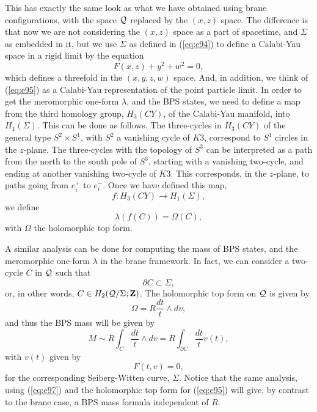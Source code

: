 This has exactly the same look as what we have obtained using
brane configurations, with the space ${\cal Q}$ replaced by the
$(x,z)$ space. The difference is that now we are not considering
the $(x,z)$ space as a part of spacetime, and $\Sigma$ as
embedded in it, but we use $\Sigma$ as defined in (\ref{eq:e94})
to define a Calabi-Yau space in a rigid limit by the equation
\begin{equation}
F(x,z)+y^2+w^2=0,
\label{eq:e95}
\end{equation}
which defines a threefold in the $(x,y,z,w)$ space. And, in
addition, we think of (\ref{eq:e95}) as a Calabi-Yau
representation of the point particle limit. In order to get the
meromorphic one-form $\lambda$, and the BPS states, we need to
define a map from the third homology group, $H_3(CY)$, of the
Calabi-Yau manifold, into $H_1(\Sigma)$. This can be done as
follows. The three-cycles in $H_3(CY)$ of the general type $S^2
\times S^1$, with $S^2$ a vanishing cycle of $K3$, correspond to
$S^1$ circles in the $z$-plane. The three-cycles with the
topology of $S^3$ can be interpreted as a path from the north to
the south pole of $S^3$, starting with a vanishing two-cycle, and
ending at another vanishing two-cycle of $K3$. This corresponds,
in the $z$-plane, to paths going from $e_i^+$ to $e_i^-$. Once we
have defined this map,
\begin{equation}
f: H_3(CY) \longrightarrow H_1(\Sigma),
\label{eq:e96}
\end{equation}
we define 
\begin{equation}
\lambda (f(C)) = \Omega (C),
\label{eq:e97}
\end{equation}
with $\Omega$ the holomorphic top form. 
  
A similar analysis can be done for computing the mass of BPS
states, and the meromorphic one-form $\lambda$ in the brane
framework. In fact, we can consider a two-cycle $C$ in ${\cal Q}$
such that
\begin{equation}
\partial C \subset \Sigma,
\label{eq:e98}
\end{equation}
or, in other words, $C \in H_2({\cal Q}/\Sigma;{\bf Z})$. The
holomorphic top form on ${\cal Q}$ is given by
\begin{equation}
\Omega = R \frac {dt}{t} \wedge dv,
\label{eq:e99}
\end{equation}
and thus the BPS mass will be given by
\begin{equation}
M \sim R \int_C \frac {dt}{t} \wedge dv = R \int_{\partial C}
\frac {dt}{t} v(t),
\label{eq:e100}
\end{equation}
with $v(t)$ given by
\begin{equation}
F(t,v)=0,
\label{eq:e101}
\end{equation}
for the corresponding Seiberg-Witten curve, $\Sigma$. Notice that
the same analysis, using (\ref{eq:e97}) and the holomorphic top
form for (\ref{eq:e95}) will give, by contrast to the brane case,
a BPS mass formula independent of $R$.
  
